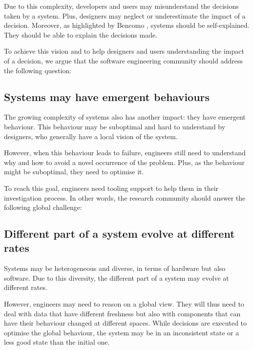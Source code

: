 Due to this complexity, developers and users may misunderstand the decisions taken by a system.
Plus, designers may neglect or underestimate the impact of a decision.
Moreover, as highlighted by Bencomo \etal \cite{DBLP:conf/iceccs/BencomoWSW12}, systems should be self-explained.
They should be able to explain the decisions made.

To achieve this vision and to help designers and users understanding the impact of a decision, we argue that the software engineering community should address the following question:
\vspace{-2em}

\subsection{Systems may have emergent behaviours}
\label{intro:challenges:ermger-bhv}
The growing complexity of systems also has another impact: they have emergent behaviour.
This behaviour may be suboptimal and hard to understand by designers, who generally have a local vision of the system.

However, when this behaviour leads to failure, engineers still need to understand why and how to avoid a novel occurrence of the problem.
Plus, as the behaviour might be suboptimal, they need to optimise it.

To reach this goal, engineers need tooling support to help them in their investigation process.
In other words, the research community should answer the following global challenge:
\vspace{-2em}

\subsection{Different part of a system evolve at different rates}
\label{intro:challenges:diff-paces}
Systems may be heterogeneous and diverse, in terms of hardware but also software.
Due to this diversity, the different part of a system may evolve at different rates.

However, engineers may need to reason on a global view.
They will thus need to deal with data that have different freshness but also with components that can have their behaviour changed at different spaces.
While decisions are executed to optimise the global behaviour, the system may be in an inconsistent state or a less good state than the initial one.


